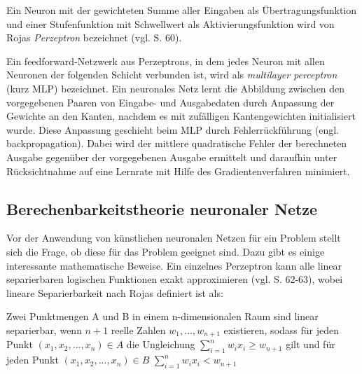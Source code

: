 \documentclass[
	12pt,
	a4paper,
	BCOR10mm,
	DIV14,
	listof=totoc,
	bibliography=totoc,
	headsepline
]{scrreprt}
\begin{document}
Ein Neuron mit der gewichteten Summe aller Eingaben als Übertragungsfunktion und einer Stufenfunktion mit Schwellwert als Aktivierungsfunktion wird von Rojas \textit{Perzeptron} bezeichnet (vgl. \cite{Rojas:1996:NNS:235222} S. 60).
\medskip

Ein feedforward-Netzwerk aus Perzeptrons, in dem jedes Neuron mit allen Neuronen der folgenden Schicht verbunden ist, wird als \textit{multilayer perceptron} (kurz MLP) bezeichnet.
Ein neuronales Netz lernt die Abbildung zwischen den vorgegebenen Paaren von Eingabe- und Ausgabedaten durch Anpassung der Gewichte an den Kanten, nachdem es mit zufälligen Kantengewichten initialisiert wurde.
Diese Anpassung geschieht beim MLP durch Fehlerrückführung (engl. backpropagation). Dabei wird der mittlere quadratische Fehler der berechneten Ausgabe gegenüber der vorgegebenen Ausgabe ermittelt und daraufhin unter Rücksichtnahme auf eine Lernrate mit Hilfe des Gradientenverfahren minimiert.

\subsection{Berechenbarkeitstheorie neuronaler Netze}
Vor der Anwendung von künstlichen neuronalen Netzen für ein Problem stellt sich die Frage, ob diese für das Problem geeignet sind. Dazu gibt es einige interessante mathematische Beweise.
Ein einzelnes Perzeptron kann alle linear separierbaren logischen Funktionen exakt approximieren (vgl. \cite{Rojas:1996:NNS:235222} S. 62-63), wobei lineare Separierbarkeit nach Rojas definiert ist als:

Zwei Punktmengen A und B in einem n-dimensionalen Raum sind linear separierbar, wenn $n + 1$ reelle Zahlen $w_1,...,w_{n+1}$ existieren, sodass für jeden Punkt $(x_1,x_2,...,x_n) \in A$ die Ungleichung $\sum_{i=1}^{n} w_ix_i \ge w_{n+1}$ gilt und für jeden Punkt $(x_1,x_2,...,x_n) \in B$ $\sum_{i=1}^{n} w_ix_i < w_{n+1}$
\end{document}

